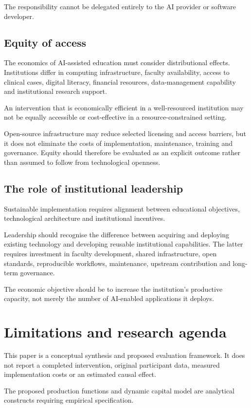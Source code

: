 \documentclass[11pt,a4paper]{article}
\begin{document}
The responsibility cannot be delegated entirely to the AI provider or software developer.

\subsection{Equity of access}
The economics of AI-assisted education must consider distributional effects. Institutions differ in computing infrastructure, faculty availability, access to clinical cases, digital literacy, financial resources, data-management capability and institutional research support.

An intervention that is economically efficient in a well-resourced institution may not be equally accessible or cost-effective in a resource-constrained setting.

Open-source infrastructure may reduce selected licensing and access barriers, but it does not eliminate the costs of implementation, maintenance, training and governance. Equity should therefore be evaluated as an explicit outcome rather than assumed to follow from technological openness.

\subsection{The role of institutional leadership}
Sustainable implementation requires alignment between educational objectives, technological architecture and institutional incentives.

Leadership should recognise the difference between acquiring and deploying existing technology and developing reusable institutional capabilities. The latter requires investment in faculty development, shared infrastructure, open standards, reproducible workflows, maintenance, upstream contribution and long-term governance.

The economic objective should be to increase the institution's productive capacity, not merely the number of AI-enabled applications it deploys.

\section{Limitations and research agenda}
This paper is a conceptual synthesis and proposed evaluation framework. It does not report a completed intervention, original participant data, measured implementation costs or an estimated causal effect.

The proposed production functions and dynamic capital model are analytical constructs requiring empirical specification.
\end{document}
